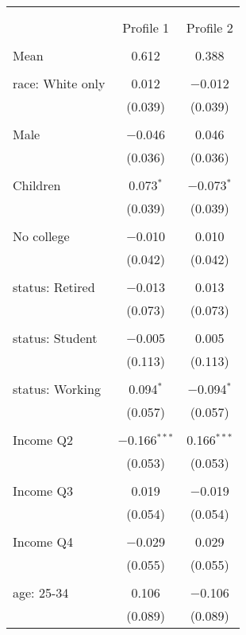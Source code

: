 
\begin{tabular}{@{\extracolsep{5pt}}lcc} 
\\[-1.8ex]\hline 
\hline \\[-1.8ex] 
\\[-1.8ex] & Profile 1 & Profile 2 \\ 
\hline \\[-1.8ex] 
 Mean & 0.612 & 0.388  \\ \hline \\[-1.8ex] race: White only & 0.012 & $-$0.012 \\ 
  & (0.039) & (0.039) \\ 
  & & \\ 
 Male & $-$0.046 & 0.046 \\ 
  & (0.036) & (0.036) \\ 
  & & \\ 
 Children & 0.073$^{*}$ & $-$0.073$^{*}$ \\ 
  & (0.039) & (0.039) \\ 
  & & \\ 
 No college & $-$0.010 & 0.010 \\ 
  & (0.042) & (0.042) \\ 
  & & \\ 
 status: Retired & $-$0.013 & 0.013 \\ 
  & (0.073) & (0.073) \\ 
  & & \\ 
 status: Student & $-$0.005 & 0.005 \\ 
  & (0.113) & (0.113) \\ 
  & & \\ 
 status: Working & 0.094$^{*}$ & $-$0.094$^{*}$ \\ 
  & (0.057) & (0.057) \\ 
  & & \\ 
 Income Q2 & $-$0.166$^{***}$ & 0.166$^{***}$ \\ 
  & (0.053) & (0.053) \\ 
  & & \\ 
 Income Q3 & 0.019 & $-$0.019 \\ 
  & (0.054) & (0.054) \\ 
  & & \\ 
 Income Q4 & $-$0.029 & 0.029 \\ 
  & (0.055) & (0.055) \\ 
  & & \\ 
 age: 25-34 & 0.106 & $-$0.106 \\ 
  & (0.089) & (0.089) \\ 

\end{tabular}
